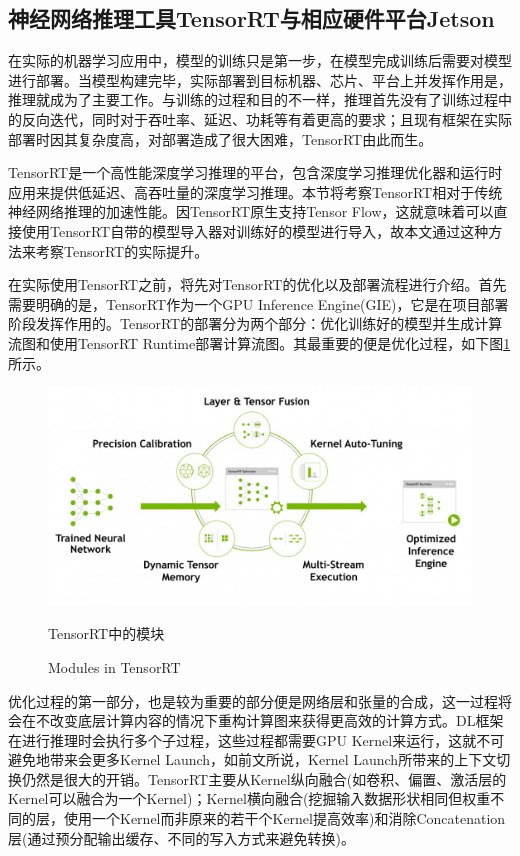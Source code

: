 \subsection{神经网络推理工具TensorRT与相应硬件平台Jetson}
\par 在实际的机器学习应用中，模型的训练只是第一步，在模型完成训练后需要对模型进行部署。当模型构建完毕，实际部署到目标机器、芯片、平台上并发挥作用是，推理就成为了主要工作。与训练的过程和目的不一样，推理首先没有了训练过程中的反向迭代，同时对于吞吐率、延迟、功耗等有着更高的要求；且现有框架在实际部署时因其复杂度高，对部署造成了很大困难，TensorRT由此而生。
\par TensorRT是一个高性能深度学习推理的平台，包含深度学习推理优化器和运行时应用来提供低延迟、高吞吐量的深度学习推理。本节将考察TensorRT相对于传统神经网络推理的加速性能\cite{TENSORRT}。因TensorRT原生支持Tensor Flow，这就意味着可以直接使用TensorRT自带的模型导入器对训练好的模型进行导入，故本文通过这种方法来考察TensorRT的实际提升。
\par 在实际使用TensorRT之前，将先对TensorRT的优化以及部署流程进行介绍。首先需要明确的是，TensorRT作为一个GPU Inference Engine(GIE)，它是在项目部署阶段发挥作用的。TensorRT的部署分为两个部分：优化训练好的模型并生成计算流图和使用TensorRT Runtime部署计算流图。其最重要的便是优化过程，如下图\ref{Fig.TensorRT}所示\cite{TENSORRTDOC}。
\begin{figure}
	\centering
	\includegraphics[width=15cm]{figures/TensorRT.jpg}
	\renewcommand{\thefigure}{\arabic{section}-\arabic{figure} }
	\renewcommand{\figurename}{图}
	\caption{TensorRT中的模块\cite{TENSORRT}}
	\addtocounter{figure}{-1}
	\renewcommand{\thefigure}{\arabic{section}-\arabic{figure} }
	\renewcommand{\figurename}{Figure}
	\caption{Modules in TensorRT\cite{TENSORRT}}
	\label{Fig.TensorRT}
\end{figure}
\par 优化过程的第一部分，也是较为重要的部分便是网络层和张量的合成，这一过程将会在不改变底层计算内容的情况下重构计算图来获得更高效的计算方式。DL框架在进行推理时会执行多个子过程，这些过程都需要GPU Kernel来运行，这就不可避免地带来会更多Kernel Launch，如前文所说，Kernel Launch所带来的上下文切换仍然是很大的开销。TensorRT主要从Kernel纵向融合(如卷积、偏置、激活层的Kernel可以融合为一个Kernel)；Kernel横向融合(挖掘输入数据形状相同但权重不同的层，使用一个Kernel而非原来的若干个Kernel提高效率)和消除Concatenation层(通过预分配输出缓存、不同的写入方式来避免转换)。
